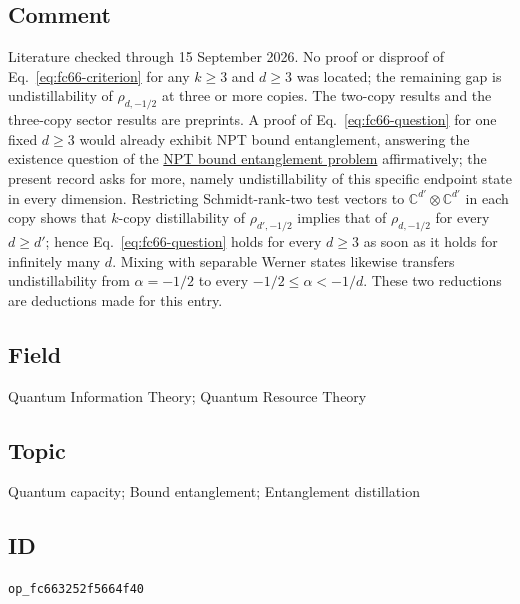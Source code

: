 \subsection*{Comment}

Literature checked through 15 September 2026.  No proof or disproof of
Eq.~\eqref{eq:fc66-criterion} for any $k\geq3$ and $d\geq3$ was located; the
remaining gap is undistillability of $\rho_{d,-1/2}$ at three or more copies.
The two-copy results and the three-copy sector results are preprints.  A proof
of Eq.~\eqref{eq:fc66-question} for one fixed $d\geq3$ would already exhibit
NPT bound entanglement, answering the existence question of the
\href{https://qiqc-op.com/problem/op_74c4ffb5b042baf2/}{NPT bound entanglement problem}
affirmatively; the present record asks for more, namely undistillability of
this specific endpoint state in every dimension.  Restricting Schmidt-rank-two
test vectors to $\mathbb C^{d'}\otimes\mathbb C^{d'}$ in each copy shows that
$k$-copy distillability of $\rho_{d',-1/2}$ implies that of $\rho_{d,-1/2}$
for every $d\geq d'$; hence Eq.~\eqref{eq:fc66-question} holds for every
$d\geq3$ as soon as it holds for infinitely many $d$.  Mixing with separable
Werner states likewise transfers undistillability from $\alpha=-1/2$ to every
$-1/2\leq\alpha<-1/d$.  These two reductions are deductions made for this
entry.

\subsection*{Field}

Quantum Information Theory; Quantum Resource Theory

\subsection*{Topic}

Quantum capacity; Bound entanglement; Entanglement distillation

\subsection*{ID}

\texttt{op\_fc663252f5664f40}
